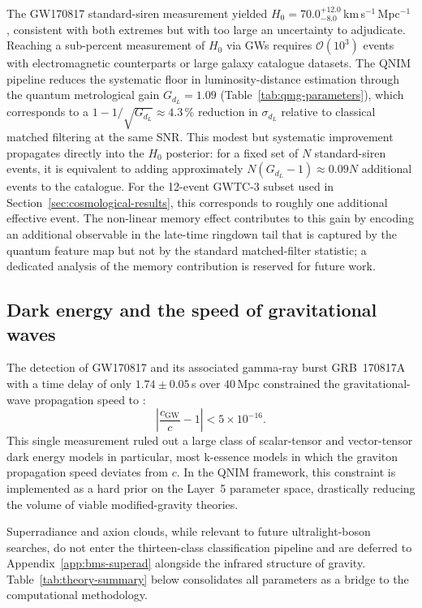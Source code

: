 \documentclass[11pt,a4paper, english]{book}
\theoremstyle{plain}
\theoremstyle{definition}
\numberwithin{equation}{chapter}
\numberwithin{figure}{chapter}
\numberwithin{table}{chapter}
\begin{document}
The GW170817 standard-siren measurement yielded
$H_0 = 70.0^{+12.0}_{-8.0}$\,km\,s$^{-1}$\,Mpc$^{-1}$ \cite{Abbott_2017c},
consistent with both extremes but with too large an uncertainty to adjudicate.
Reaching a sub-percent measurement of $H_0$ via GWs requires
$\mathcal{O}(10^3)$ events with electromagnetic counterparts or large
galaxy catalogue datasets.  The QNIM pipeline reduces the systematic floor in luminosity-distance
estimation through the quantum metrological gain $G_{d_L} = 1.09$
(Table~\ref{tab:qmg-parameters}), which corresponds to a
$1 - 1/\sqrt{G_{d_L}} \approx 4.3\,\%$ reduction in $\sigma_{d_L}$
relative to classical matched filtering at the same SNR\@. This modest
but systematic improvement propagates directly into the $H_0$ posterior:
for a fixed set of $N$ standard-siren events, it is equivalent to
adding approximately $N(G_{d_L} - 1) \approx 0.09N$ additional
events to the catalogue. For the 12-event GWTC-3 subset used in
Section~\ref{sec:cosmological-results}, this corresponds to roughly
one additional effective event. The non-linear memory effect
\cite{Christodoulou_1991} contributes to this gain by encoding
an additional observable in the late-time ringdown tail that is
captured by the quantum feature map but not by the standard
matched-filter statistic; a dedicated analysis of the memory
contribution is reserved for future work.

\subsection{Dark energy and the speed of gravitational waves}
\label{subsec:dark-energy}

The detection of GW170817 and its associated gamma-ray burst GRB~170817A
with a time delay of only $1.74 \pm 0.05$\,s over $40$\,Mpc constrained
the gravitational-wave propagation speed to \cite{Abbott_2017b}:
\begin{equation}
  \label{eq:speed_constraint}
  \left|\frac{c_\mathrm{GW}}{c} - 1\right| < 5\times10^{-16}.
\end{equation}
This single measurement ruled out a large class of scalar-tensor and
vector-tensor dark energy models  in particular, most k-essence models
\cite{Armendariz_2001} in which the graviton propagation speed deviates
from $c$.  In the QNIM framework, this constraint is implemented as a hard
prior on the Layer~5 parameter space, drastically reducing the volume of
viable modified-gravity theories.

Superradiance and axion clouds, while relevant to future ultralight-boson
searches, do not enter the thirteen-class classification pipeline and
are deferred to Appendix~\ref{app:bms-superad} alongside the infrared
structure of gravity. Table~\ref{tab:theory-summary} below consolidates
all parameters as a bridge to the computational methodology.
\end{document}
